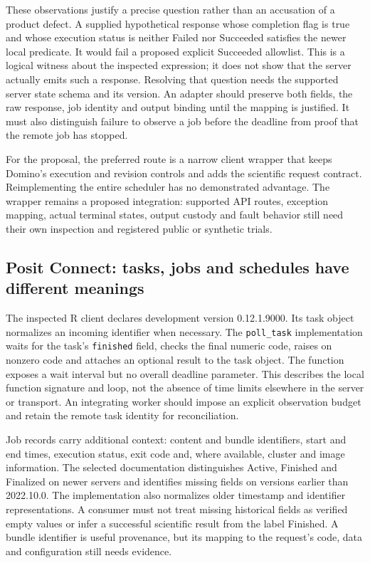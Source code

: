 These observations justify a precise question rather than an accusation of
a product defect. A supplied hypothetical response whose completion flag is
true and whose execution status is neither Failed nor Succeeded satisfies
the newer local predicate. It would fail a proposed explicit Succeeded
allowlist. This is a logical witness about the inspected expression; it does
not show that the server actually emits such a response. Resolving that
question needs the supported server state schema and its version. An adapter
should preserve both fields, the raw response, job identity and output binding
until the mapping is justified. It must also distinguish failure to observe
a job before the deadline from proof that the remote job has stopped.
\citep{exec23_workflow_client_reference,exec23_workflow_dominopy}

For the proposal, the preferred route is a narrow client wrapper that keeps
Domino's execution and revision controls and adds the scientific request
contract. Reimplementing the entire scheduler has no demonstrated advantage.
The wrapper remains a proposed integration: supported API routes, exception
mapping, actual terminal states, output custody and fault behavior still need
their own inspection and registered public or synthetic trials.

\subsection{Posit Connect: tasks, jobs and schedules have different meanings}
\label{exec23:clients-connect}

The inspected R client declares development version 0.12.1.9000. Its task
object normalizes an incoming identifier when necessary. The
\texttt{poll\_task} implementation waits for the task's
\texttt{finished} field, checks the final numeric code, raises on nonzero
code and attaches an optional result to the task object. The function exposes
a wait interval but no overall deadline parameter. This describes the local
function signature and loop, not the absence of time limits elsewhere in the
server or transport. An integrating worker should impose an explicit
observation budget and retain the remote task identity for reconciliation.
\citep{exec23_workflow_connectapi}

Job records carry additional context: content and bundle identifiers, start
and end times, execution status, exit code and, where available, cluster and
image information. The selected documentation distinguishes Active, Finished
and Finalized on newer servers and identifies missing fields on versions
earlier than 2022.10.0. The implementation also normalizes older timestamp
and identifier representations. A consumer must not treat missing historical
fields as verified empty values or infer a successful scientific result from
the label Finished. A bundle identifier is useful provenance, but its
mapping to the request's code, data and configuration still needs evidence.
\citep{exec23_workflow_connectapi}

